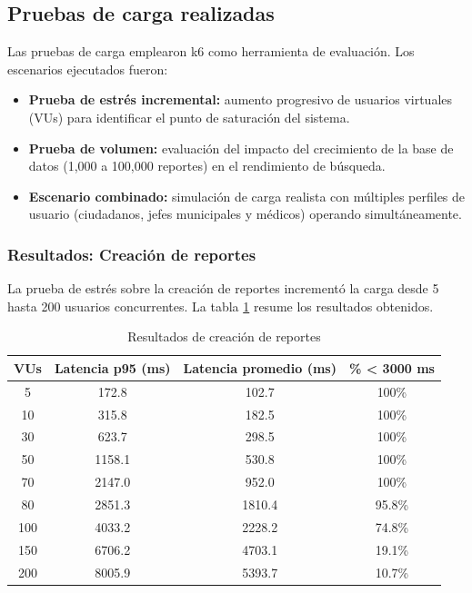 \documentclass[12pt,letterpaper]{article}
\begin{document}
\subsection{Pruebas de carga realizadas}

Las pruebas de carga emplearon k6 como herramienta de evaluación. Los escenarios ejecutados fueron:

\begin{itemize}
    \item \textbf{Prueba de estrés incremental:} aumento progresivo de usuarios virtuales (VUs) para identificar el punto de saturación del sistema.
    \item \textbf{Prueba de volumen:} evaluación del impacto del crecimiento de la base de datos (1,000 a 100,000 reportes) en el rendimiento de búsqueda.
    \item \textbf{Escenario combinado:} simulación de carga realista con múltiples perfiles de usuario (ciudadanos, jefes municipales y médicos) operando simultáneamente.
\end{itemize}

\subsubsection{Resultados: Creación de reportes}

La prueba de estrés sobre la creación de reportes incrementó la carga desde 5 hasta 200 usuarios concurrentes. La tabla \ref{tab:creacion-resultados} resume los resultados obtenidos.

\begin{table}[H]
\centering
\caption{Resultados de creación de reportes}
\label{tab:creacion-resultados}
\begin{tabular}{|c|c|c|c|}
\hline
\textbf{VUs} & \textbf{Latencia p95 (ms)} & \textbf{Latencia promedio (ms)} & \textbf{\% < 3000 ms} \\ \hline
5 & 172.8 & 102.7 & 100\% \\ \hline
10 & 315.8 & 182.5 & 100\% \\ \hline
30 & 623.7 & 298.5 & 100\% \\ \hline
50 & 1158.1 & 530.8 & 100\% \\ \hline
70 & 2147.0 & 952.0 & 100\% \\ \hline
80 & 2851.3 & 1810.4 & 95.8\% \\ \hline
100 & 4033.2 & 2228.2 & 74.8\% \\ \hline
150 & 6706.2 & 4703.1 & 19.1\% \\ \hline
200 & 8005.9 & 5393.7 & 10.7\% \\ \hline
\end{tabular}
\end{table}
\end{document}
